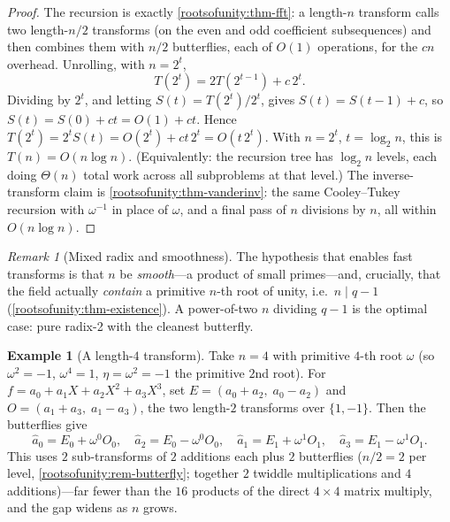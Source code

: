 \documentclass[11pt,a4paper]{article}
\theoremstyle{definition}
\newtheorem{example}[theorem]{Example}
\theoremstyle{remark}
\newtheorem{remark}[theorem]{Remark}
\begin{document}
\begin{proof}
The recursion is exactly \cref{rootsofunity:thm-fft}: a length-\(n\) transform calls two length-\(n/2\) transforms (on the even and odd coefficient subsequences) and then combines them with \(n/2\) butterflies, each of \(O(1)\) operations, for the \(cn\) overhead. Unrolling, with \(n = 2^t\),
\[
  T(2^t) = 2T(2^{t-1}) + c\,2^t.
\]
Dividing by \(2^t\), and letting \(S(t) = T(2^t)/2^t\), gives \(S(t) = S(t-1) + c\), so \(S(t) = S(0) + ct = O(1) + ct\). Hence \(T(2^t) = 2^t S(t) = O(2^t) + ct\,2^t = O(t\,2^t)\). With \(n = 2^t\), \(t = \log_2 n\), this is \(T(n) = O(n\log n)\). (Equivalently: the recursion tree has \(\log_2 n\) levels, each doing \(\Theta(n)\) total work across all subproblems at that level.) The inverse-transform claim is \cref{rootsofunity:thm-vanderinv}: the same Cooley--Tukey recursion with \(\omega^{-1}\) in place of \(\omega\), and a final pass of \(n\) divisions by \(n\), all within \(O(n\log n)\).
\end{proof}

\begin{remark}[Mixed radix and smoothness]\label{rootsofunity:rem-mixedradix}
The hypothesis that enables fast transforms is that \(n\) be \emph{smooth}---a product of small primes---and, crucially, that the field actually \emph{contain} a primitive \(n\)-th root of unity, i.e.\ \(n \mid q-1\) (\cref{rootsofunity:thm-existence}). A power-of-two \(n\) dividing \(q-1\) is the optimal case: pure radix-2 with the cleanest butterfly.
\end{remark}

\begin{example}[A length-\(4\) transform]\label{rootsofunity:exp-fft4}
Take \(n = 4\) with primitive \(4\)-th root \(\omega\) (so \(\omega^2 = -1\), \(\omega^4 = 1\), \(\eta = \omega^2 = -1\) the primitive \(2\)nd root). For \(f = a_0 + a_1 X + a_2 X^2 + a_3 X^3\), set \(E = (a_0 + a_2,\; a_0 - a_2)\) and \(O = (a_1 + a_3,\; a_1 - a_3)\), the two length-\(2\) transforms over \(\{1,-1\}\). Then the butterflies give
\[
  \hat a_0 = E_0 + \omega^0 O_0,\quad \hat a_2 = E_0 - \omega^0 O_0,\quad
  \hat a_1 = E_1 + \omega^1 O_1,\quad \hat a_3 = E_1 - \omega^1 O_1.
\]
This uses \(2\) sub-transforms of \(2\) additions each plus \(2\) butterflies (\(n/2 = 2\) per level, \cref{rootsofunity:rem-butterfly}; together \(2\) twiddle multiplications and \(4\) additions)---far fewer than the \(16\) products of the direct \(4\times4\) matrix multiply, and the gap widens as \(n\) grows.
\end{example}
\end{document}
